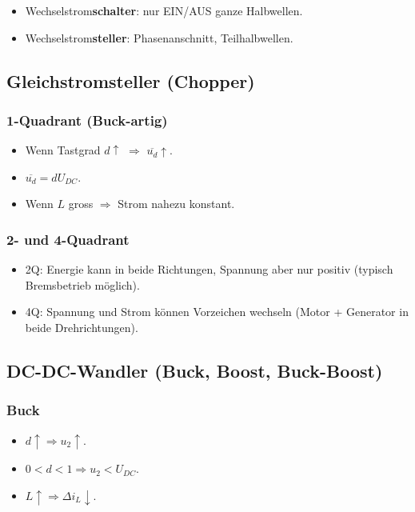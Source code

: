 \begin{itemize}
\item Wechselstrom\textbf{schalter}: nur EIN/AUS ganze Halbwellen.
\item Wechselstrom\textbf{steller}: Phasenanschnitt, Teilhalbwellen.
\end{itemize}

\subsection{Gleichstromsteller (Chopper)}

\subsubsection{1-Quadrant (Buck-artig)}

\begin{itemize}
\item Wenn Tastgrad $d\uparrow$ $\Rightarrow$ $\overline{u_d}\uparrow$.
\item $\overline{u_d}=dU_{DC}$.
\item Wenn $L$ gross $\Rightarrow$ Strom nahezu konstant.
\end{itemize}

\subsubsection{2- und 4-Quadrant}

\begin{itemize}
\item 2Q: Energie kann in beide Richtungen, Spannung aber nur positiv (typisch Bremsbetrieb möglich).
\item 4Q: Spannung und Strom können Vorzeichen wechseln (Motor + Generator in beide Drehrichtungen).
\end{itemize}

\subsection{DC-DC-Wandler (Buck, Boost, Buck-Boost)}

\subsubsection{Buck}

\begin{itemize}
\item $d\uparrow \Rightarrow u_2\uparrow$.
\item $0<d<1 \Rightarrow u_2 < U_{DC}$.
\item $L\uparrow \Rightarrow \Delta i_L \downarrow$.
\end{itemize}

